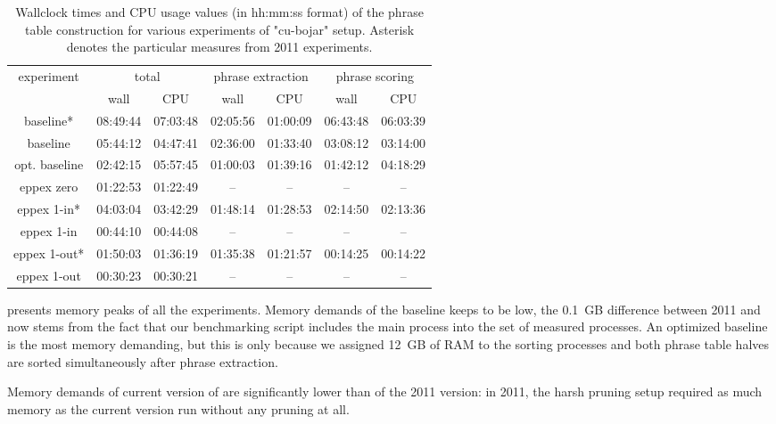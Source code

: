 \begin{table}[ht]
\centering
\begin{tabular}{ | c | c c | c c | c c | }
\hline
experiment & \multicolumn{2}{|c|}{total} & \multicolumn{2}{|c|}{phrase extraction} & \multicolumn{2}{|c|}{phrase scoring} \\
 & wall & CPU & wall & CPU & wall & CPU \\
\hline
\hline
baseline*     & 08:49:44 & 07:03:48 & 02:05:56 & 01:00:09 & 06:43:48 & 06:03:39 \\
baseline      & 05:44:12 & 04:47:41 & 02:36:00 & 01:33:40 & 03:08:12 & 03:14:00 \\
opt. baseline & 02:42:15 & 05:57:45 & 01:00:03 & 01:39:16 & 01:42:12 & 04:18:29 \\
eppex zero    & 01:22:53 & 01:22:49 & -- & -- & -- & -- \\
\hline
eppex 1-in*   & 04:03:04 & 03:42:29 & 01:48:14 & 01:28:53 & 02:14:50 & 02:13:36 \\
eppex 1-in    & 00:44:10 & 00:44:08 & -- & -- & -- & -- \\
\hline
eppex 1-out*  & 01:50:03 & 01:36:19 & 01:35:38 & 01:21:57 & 00:14:25 & 00:14:22 \\
eppex 1-out   & 00:30:23 & 00:30:21 & -- & -- & -- & -- \\
\hline
\end{tabular}
\caption{\label{cu-bojar-time-benchmarks}Wallclock times and CPU usage values
(in hh:mm:ss format) of the phrase table construction for various experiments
of "cu-bojar" setup. Asterisk denotes the particular measures from 2011
experiments.}
\end{table}

 presents memory peaks of all the
experiments.
Memory demands of the baseline keeps to be low, the 0.1~GB difference between 2011
and now stems from the fact that our benchmarking script includes the main process
into the set of measured processes.
An optimized baseline is the most memory demanding, but this is only because we
assigned 12~GB of RAM to the sorting processes and both phrase table halves are sorted
simultaneously after phrase extraction.

Memory demands of current version of \eppex{} are significantly lower than of the 2011
version: in 2011, the harsh pruning setup required as much memory as the current version
run without any pruning at all.

